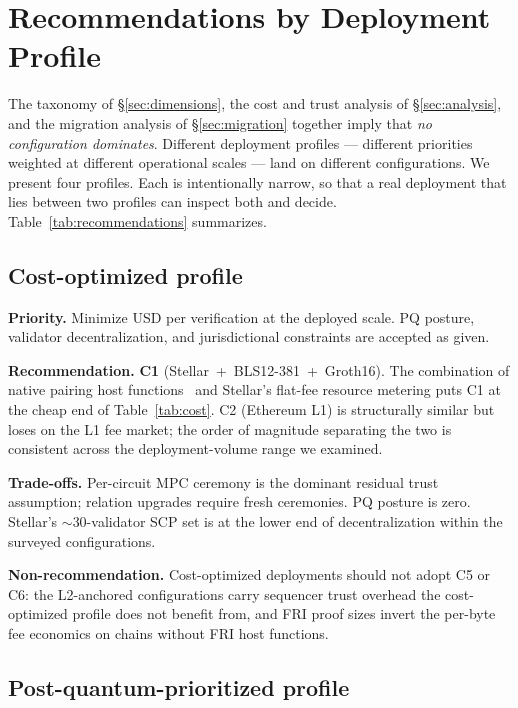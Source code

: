 \section{Recommendations by Deployment Profile}
\label{sec:recommendations}

The taxonomy of \S\ref{sec:dimensions}, the cost and trust analysis
of \S\ref{sec:analysis}, and the migration analysis of
\S\ref{sec:migration} together imply that \emph{no configuration
dominates}. Different deployment profiles --- different priorities
weighted at different operational scales --- land on different
configurations. We present four profiles. Each is intentionally
narrow, so that a real deployment that lies between two profiles can
inspect both and decide. Table~\ref{tab:recommendations} summarizes.

\subsection{Cost-optimized profile}
\label{sec:rec-cost}

\textbf{Priority.} Minimize USD per verification at the deployed scale.
PQ posture, validator decentralization, and jurisdictional
constraints are accepted as given.

\textbf{Recommendation.} \textbf{C1} (Stellar~+~BLS12-381~+~Groth16).
The combination of native pairing host
functions~\cite{stellar-cap-0059} and Stellar's flat-fee resource
metering puts C1 at the cheap end of Table~\ref{tab:cost}. C2
(Ethereum L1) is structurally similar but loses on the L1 fee
market; the order of magnitude separating the two is consistent
across the deployment-volume range we examined.

\textbf{Trade-offs.} Per-circuit MPC ceremony is the dominant
residual trust assumption; relation upgrades require fresh
ceremonies. PQ posture is zero. Stellar's $\sim$30-validator SCP set
is at the lower end of decentralization within the surveyed
configurations.

\textbf{Non-recommendation.} Cost-optimized deployments should not
adopt C5 or C6: the L2-anchored configurations carry sequencer trust
overhead the cost-optimized profile does not benefit from, and FRI
proof sizes invert the per-byte fee economics on chains without FRI
host functions.

\subsection{Post-quantum-prioritized profile}
\label{sec:rec-pq}

